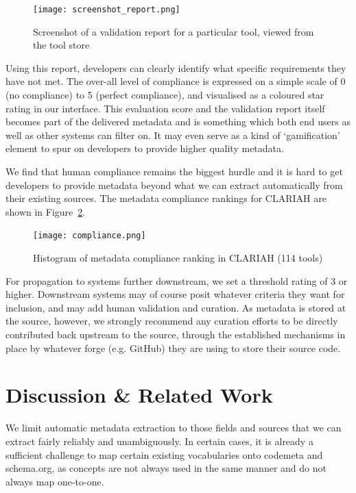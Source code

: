 \documentclass[a4paper,11pt]{article}
\begin{document}
\begin{figure}[h]
\begin{center}
\texttt{[image: screenshot\_report.png]}
\caption{Screenshot of a validation report for a particular tool, viewed from the tool store}
\label{fig:validationreport}
\end{center}
\end{figure}

Using this report, developers can clearly identify what specific requirements
they have not met. The over-all level of compliance is expressed on a simple
scale of 0 (no compliance) to 5 (perfect compliance), and visualised as a
coloured star rating in our interface. This evaluation score and the validation
report itself becomes part of the delivered metadata and is something which
both end users as well as other systems can filter on. It may even serve as a
kind of `gamification' element to spur on developers to provide higher quality
metadata.

We find that human compliance remains the biggest hurdle and it is hard to get
developers to provide metadata beyond what we can extract automatically from
their existing sources. The metadata compliance rankings for CLARIAH are shown
in Figure~\ref{fig:compliance}.

\begin{figure}[h!]
\begin{center}
\texttt{[image: compliance.png]}
\caption{Histogram of metadata compliance ranking in CLARIAH (114 tools)}
\label{fig:compliance}
\end{center}
\end{figure}

For propagation to systems further downstream, we set a threshold rating of 3
or higher. Downstream systems may of course posit whatever criteria they want
for inclusion, and may add human validation and curation. As metadata is stored
at the source, however, we strongly recommend any curation efforts to be
directly contributed back upstream to the source, through the established mechanisms
in place by whatever forge (e.g. GitHub) they are using to store their source
code.

\section{Discussion \& Related Work}

We limit automatic metadata extraction to those fields and sources that we can
extract fairly reliably and unambiguously. In certain cases, it is already a
sufficient challenge to map certain existing vocabularies onto codemeta and
schema.org, as concepts are not always used in the same manner and do not always
map one-to-one.
\end{document}

